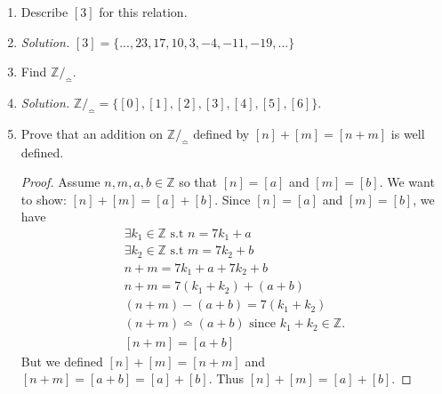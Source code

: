 \documentclass{article}
\theoremstyle{claim}
\theoremstyle{definition}
\begin{document}
\begin{enumerate}
\begin{enumerate}
\begin{proof}
\begin{enumerate}
                        \begin{gather*}
                            a - b + b - c = 7q_1 + 7q_2\\
                            a - c = 7q_1 + 7q_2\\
                            a - c = 7(q_1 + q_2)
                        \end{gather*}
                        Since $q_1$ and $q_2 \in \mathbb{Z}$, $q_1 + q_2 \in \mathbb{Z}$. So then $a - c$ is divisible by $7$ and thus $a \bumpeq c$. $\bumpeq$ is transitive.
                \end{enumerate}
            \end{proof}
            \item Describe $[3]$ for this relation.
            \item[] \emph{Solution. } $[3] = \{ ..., 23, 17, 10, 3, -4, -11, -19, ...\}$
            \item Find $\mathbb{Z}/_{\bumpeq}$.
            \item[] \emph{Solution. } $\mathbb{Z}/_{\bumpeq} = \{ [0], [1], [2], [3], [4], [5], [6] \}$.
            \item Prove that an addition on $\mathbb{Z}/_{\bumpeq}$ defined by $[n] + [m] = [n + m]$ is well defined.
            \begin{proof}
                Assume $n, m, a, b \in \mathbb{Z}$ so that $[n] = [a]$ and $[m] = [b]$. We want to show: $[n] + [m] = [a] + [b]$. Since $[n] = [a]$ and $[m] = [b]$, we have
                \begin{gather*}
                    \exists k_1 \in \mathbb{Z} \text{ s.t } n = 7k_1 + a\\
                    \exists k_2 \in \mathbb{Z} \text{ s.t } m = 7k_2 + b\\
                    n + m = 7k_1 + a + 7k_2 + b\\
                    n + m = 7(k_1 + k_2) + (a + b)\\
                    (n + m) - (a + b) = 7(k_1 + k_2)\\
                    (n + m) \bumpeq (a + b) \text{ since } k_1 + k_2 \in \mathbb{Z}.\\
                    [n + m] = [a + b]
                \end{gather*}
                But we defined $[n] + [m] = [n + m]$ and $[n + m] = [a + b] = [a] + [b]$. Thus $[n] + [m] = [a] + [b]$.
            \end{proof}
        \end{enumerate}

\end{enumerate}
\end{document}
